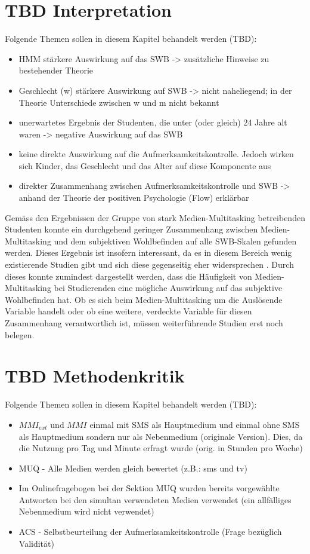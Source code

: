 \section{TBD Interpretation}\label{section.diskussion.interpretation}
Folgende Themen sollen in diesem Kapitel behandelt werden (TBD):
\begin{itemize}
    \item HMM stärkere Auswirkung auf das SWB -> zusätzliche Hinweise zu bestehender Theorie
    \item Geschlecht (w) stärkere Auswirkung auf SWB -> nicht naheliegend; in der Theorie Unterschiede zwischen w und m nicht bekannt
    \item unerwartetes Ergebnis der Studenten, die unter (oder gleich) 24 Jahre alt waren -> negative Auswirkung auf das SWB
    \item keine direkte Auswirkung auf die Aufmerksamkeitskontrolle. Jedoch wirken sich Kinder, das Geschlecht und das Alter auf diese Komponente aus
    \item direkter Zusammenhang zwischen Aufmerksamkeitskontrolle und SWB -> anhand der Theorie der positiven Psychologie (Flow) erklärbar
\end{itemize}
Gemäss den Ergebnissen der Gruppe von stark Medien-Multitasking betreibenden Studenten konnte ein durchgehend geringer Zusammenhang zwischen Medien-Multitasking und dem subjektiven Wohlbefinden auf alle SWB-Skalen gefunden werden. Dieses Ergebnis ist insofern interessant, da es in diesem Bereich wenig existierende Studien gibt und sich diese gegenseitig eher widersprechen \cite{Pea2012, Shih2013}. Durch dieses konnte zumindest dargestellt werden, dass die Häufigkeit von Medien-Multitasking bei Studierenden eine mögliche Auswirkung auf das subjektive Wohlbefinden hat. Ob es sich beim Medien-Multitasking um die Auslösende Variable handelt oder ob eine weitere, verdeckte Variable für diesen Zusammenhang verantwortlich ist, müssen weiterführende Studien erst noch belegen. 
\section{TBD Methodenkritik}\label{section.diskussion.methodenkritik}
Folgende Themen sollen in diesem Kapitel behandelt werden (TBD):
\begin{itemize}
    \item $MMI_{ext}$ und $MMI$ einmal mit SMS als Hauptmedium und einmal ohne SMS als Hauptmedium sondern nur als Nebenmedium (originale Version). Dies, da die Nutzung pro Tag und Minute erfragt wurde (orig. in Stunden pro Woche)
    \item MUQ - Alle Medien werden gleich bewertet (z.B.: sms und tv)
    \item Im Onlinefragebogen bei der Sektion MUQ wurden bereits vorgewählte Antworten bei den simultan verwendeten Medien verwendet (ein allfälliges Nebenmedium wird nicht verwendet)
    \item ACS - Selbstbeurteilung der Aufmerksamkeitskontrolle (Frage bezüglich Validität)
\end{itemize}



